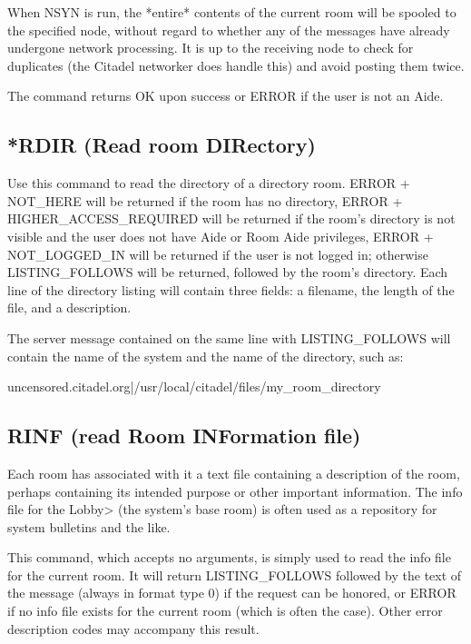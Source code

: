  When NSYN is run, the *entire* contents of the current room will be spooled
to the specified node, without regard to whether any of the messages have
already undergone network processing.  It is up to the receiving node to
check for duplicates (the Citadel networker does handle this) and avoid
posting them twice.

 The command returns OK upon success or ERROR if the user is not an Aide.



\subsection{*RDIR (Read room DIRectory)}

 Use this command to read the directory of a directory room.  ERROR + NOT_HERE
will be returned if the room has no directory, ERROR + HIGHER_ACCESS_REQUIRED
will be returned if the room's directory is not visible and the user does not
have Aide or Room Aide privileges, ERROR + NOT_LOGGED_IN will be returned if
the user is not logged in; otherwise LISTING_FOLLOWS will be returned,
followed by the room's directory.  Each line of the directory listing will
contain three fields: a filename, the length of the file, and a description.

 The server message contained on the same line with LISTING_FOLLOWS will
contain the name of the system and the name of the directory, such as:

  uncensored.citadel.org|/usr/local/citadel/files/my_room_directory



\subsection{RINF (read Room INFormation file)}

 Each room has associated with it a text file containing a description of
the room, perhaps containing its intended purpose or other important
information.  The info file for the Lobby> (the system's base room) is
often used as a repository for system bulletins and the like.

 This command, which accepts no arguments, is simply used to read the info
file for the current room.  It will return LISTING_FOLLOWS followed by
the text of the message (always in format type 0) if the request can be
honored, or ERROR if no info file exists for the current room (which is
often the case).  Other error description codes may accompany this result.

